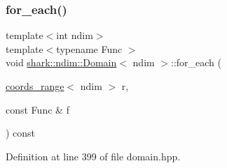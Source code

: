 \subsubsection{\texorpdfstring{for\+\_\+each()}{for\_each()}\hspace{0.1cm}{\footnotesize\ttfamily [2/3]}}
{\footnotesize\ttfamily template$<$int ndim$>$ \\
template$<$typename Func $>$ \\
void \hyperlink{classshark_1_1ndim_1_1_domain}{shark\+::ndim\+::\+Domain}$<$ ndim $>$\+::for\+\_\+each (\begin{DoxyParamCaption}\item[{\hyperlink{structshark_1_1ndim_1_1coords__range}{coords\+\_\+range}$<$ ndim $>$}]{r,  }\item[{const Func \&}]{f }\end{DoxyParamCaption}) const}



Definition at line 399 of file domain.\+hpp.


